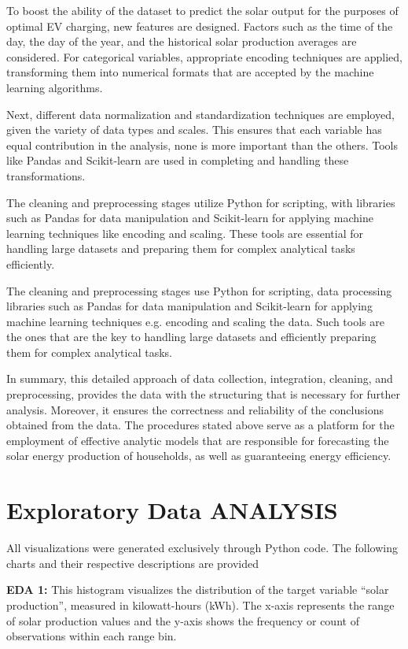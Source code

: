 \documentclass[conference]{IEEEtran}
\begin{document}
To boost the ability of the dataset to predict the solar output for the purposes of optimal EV charging, new features are designed. Factors such as the time of the day, the day of the year, and the historical solar production averages are considered. For categorical variables, appropriate encoding techniques are applied, transforming them into numerical formats that are accepted by the machine learning algorithms.

Next, different data normalization and standardization techniques are employed, given the variety of data types and scales. This ensures that each variable has equal contribution in the analysis, none is more important than the others. Tools like Pandas and Scikit-learn are used in completing and handling these transformations.

The cleaning and preprocessing stages utilize Python for scripting, with libraries such as Pandas for data manipulation and Scikit-learn for applying machine learning techniques like encoding and scaling. These tools are essential for handling large datasets and preparing them for complex analytical tasks efficiently.

The cleaning and preprocessing stages use Python for scripting, data processing libraries such as Pandas for data manipulation and Scikit-learn for applying machine learning techniques e.g. encoding and scaling the data. Such tools are the ones that are the key to handling large datasets and efficiently preparing them for complex analytical tasks.

In summary, this detailed approach of data collection, integration, cleaning, and preprocessing, provides the data with the structuring that is necessary for further analysis. Moreover, it ensures the correctness and reliability of the conclusions obtained from the data. The procedures stated above serve as a platform for the employment of effective analytic models that are responsible for forecasting the solar energy production of households, as well as guaranteeing energy efficiency.

\section{Exploratory Data ANALYSIS}
All visualizations were generated exclusively through Python code. The following charts and their respective descriptions are provided

\textbf{EDA 1:} This histogram visualizes the distribution of the target variable “solar production”, measured in kilowatt-hours (kWh). The x-axis represents the range of solar production values and the y-axis shows the frequency or count of observations within each range bin.
\end{document}
